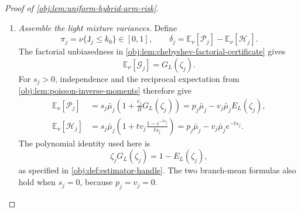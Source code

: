\documentclass[11pt]{article}
\begin{document}
\begin{proof}[Proof of \cref{obj:lem:uniform-hybrid-arm-risk}]
\begin{enumerate}
For \(s_j\le B\), the following bounds retain each mixed monomial:
\[
\begin{aligned}
\frac{s_jv_j^2}{B^2}&\le\frac{p_j}{\epsilon},&
\frac{s_jv_j}{tB^2}&\le v_j,&
\frac{s_j^2v_j}{tB^2}&\le\frac{p_j}{t},\\
\frac{s_j^2v_j^2}{B^2}&\le p_j^2,&
s_j^2&\le p_j^2,&
p_j&\le\frac B\epsilon.
\end{aligned}
\]
When \(s_j>0\), the first follows from
\(s_jv_j^2/B^2\le v_j^2/s_j\le p_j/\epsilon\).
The second follows from \(s_j\le B\le tB^2\), since \(tB\ge1\).
The next two use \(s_j^2\le B^2\) and \(v_j\le p_j\).
When \(s_j=0\), all these inequalities follow from \(v_j=p_j=0\).

Expanding the product and using \(q_j\le s_j\) gives
\[
\begin{aligned}
&\left(\frac{q_j}{u}+q_j^2\right)
\left(1+\frac{v_j^2}{B^2}+\frac{v_j}{tB^2}\right)\\
&\quad\le
\frac{s_j}{u}
+\frac{s_jv_j^2}{uB^2}
+\frac{s_jv_j}{utB^2}
+s_j^2+\frac{s_j^2v_j^2}{B^2}
+\frac{s_j^2v_j}{tB^2}\\
&\quad\le
\frac{3p_j}{u\epsilon}+\frac{p_j}{t}+2p_j^2
\le
\frac{3p_j}{u\epsilon}+\frac{p_j}{t}
+\frac{2B^2}{\epsilon^2}.
\end{aligned}
\]
Here \(s_j,v_j\le p_j/\epsilon\) uses \(\epsilon\le1\).
Thus
\[
\operatorname{Var}_\nu(\mathcal P_j)
\le\mathbb E_\nu[\mathcal P_j^2]
\le
6F_{\mathrm{grow}}
\left(\frac{p_j}{u\epsilon}+\frac{p_j}{t}
+\frac{B^2}{\epsilon^2}\right).
\]
Summation yields
\[
\sum_{j\in\mathcal J_{\mathrm{light}}}
\operatorname{Var}_\nu(\mathcal P_j)
\le
6F_{\mathrm{grow}}
\left(
\frac{M_{\mathrm{light}}}{u\epsilon}
+\frac{M_{\mathrm{light}}}{t}
+\frac{c_{\mathrm{light}}B^2}{\epsilon^2}
\right).
\]

\item \textit{Assemble the light mixture variances.}
Define
\[
\pi_j=\nu\{\mathsf J_j\le k_0\}\in[0,1],
\qquad
\delta_j=\mathbb E_\nu[\mathcal P_j]
-\mathbb E_\nu[\mathcal H_j].
\]
The factorial unbiasedness in
\cref{obj:lem:chebyshev-factorial-certificate} gives
\[
\mathbb E_\nu[\mathcal G_j]=G_L(\zeta_j).
\]
For \(s_j>0\), independence and the reciprocal expectation from
\cref{obj:lem:poisson-inverse-moments} therefore give
\[
\begin{aligned}
\mathbb E_\nu[\mathcal P_j]
&=s_j\bar\mu_j
\left(1+\frac{v_j}{B}G_L(\zeta_j)\right)
=p_j\bar\mu_j-v_j\bar\mu_jE_L(\zeta_j),\\
\mathbb E_\nu[\mathcal H_j]
&=s_j\bar\mu_j
\left(1+tv_j\frac{1-e^{-ts_j}}{ts_j}\right)
=p_j\bar\mu_j-v_j\bar\mu_je^{-ts_j}.
\end{aligned}
\]
The polynomial identity used here is
\[
\zeta_jG_L(\zeta_j)=1-E_L(\zeta_j),
\]
as specified in \cref{obj:def:estimator-handle}. The two branch-mean formulas also hold when \(s_j=0\), because \(p_j=v_j=0\).


\end{enumerate}
\end{proof}
\end{document}
